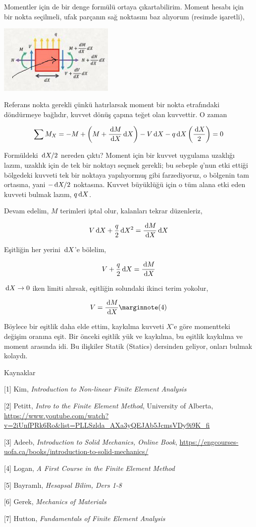 \documentclass[12pt,fleqn]{article}\usepackage{../../common}
\begin{document}
Momentler için de bir denge formülü ortaya çıkartabilirim. Moment hesabı için
bir nokta seçilmeli, ufak parçanın sağ noktasını baz alıyorum (resimde
işaretli),

\includegraphics[width=15em]{phy_020_strs_02_11.jpg}

Referans nokta gerekli çünkü hatırlarsak moment bir nokta etrafındaki
döndürmeye bağlıdır, kuvvet dönüş çapına teğet olan kuvvettir. O zaman 

$$
\sum M_{X} = -M + \left( M + \frac{\,\mathrm{d} M}{\,\mathrm{d} X} \,\mathrm{d} X \right) -
V \,\mathrm{d} X - q \,\mathrm{d} X \left( \frac{\,\mathrm{d} X}{2}  \right) = 0
$$

Formüldeki $\,\mathrm{d} X / 2$ nereden çıktı? Moment için bir kuvvet uygulama uzaklığı
lazım, uzaklık için de tek bir noktayı seçmek gerekli; bu sebeple $q$'nun etki
ettiği bölgedeki kuvveti tek bir noktaya yapılıyormuş gibi farzediyoruz, o
bölgenin tam ortasına, yani $- \,\mathrm{d} X / 2$ noktasına.  Kuvvet büyüklüğü için o
tüm alana etki eden kuvveti bulmak lazım, $q \,\mathrm{d} X$.

Devam edelim, $M$ terimleri iptal olur, kalanları tekrar düzenleriz,

$$
V \,\mathrm{d} X + \frac{q}{2} \,\mathrm{d} X^2 = \frac{\,\mathrm{d} M}{\,\mathrm{d} X} \,\mathrm{d} X
$$

Eşitliğin her yerini $\,\mathrm{d} X$'e bölelim,

$$
V + \frac{q}{2} \,\mathrm{d} X = \frac{\,\mathrm{d} M}{\,\mathrm{d} X} 
$$

$\,\mathrm{d} X \to 0$ iken limiti alırsak, eşitliğin solundaki ikinci terim yokolur,

$$
V = \frac{\ud M}{\ud X}
\mlabel{4}
$$

Böylece bir eşitlik daha elde ettim, kaykılma kuvveti $X$'e göre momentteki
değişim oranına eşit. Bir önceki eşitlik yük ve kaykılma, bu eşitlik kaykılma ve
moment arasında idi. Bu ilişkiler Statik (Statics) dersinden geliyor, onları
bulmak kolaydı.

Kaynaklar

[1] Kim, {\em Introduction to Non-linear Finite Element Analysis}

[2] Petitt, {\em Intro to the Finite Element Method}, University of Alberta,
    \url{https://www.youtube.com/watch?v=2iUnfPRk6Ro&list=PLLSzlda_AXa3yQEJAb5JcmsVDy9i9K_fi}
    
[3] Adeeb, {\em Introduction to Solid Mechanics, Online Book},
    \url{https://engcourses-uofa.ca/books/introduction-to-solid-mechanics/}

[4] Logan, {\em A First Course in the Finite Element Method}

[5] Bayramlı, {\em Hesapsal Bilim, Ders 1-8}

[6] Gerek, {\em Mechanics of Materials}

[7] Hutton, {\em Fundamentals of Finite Element Analysis}
\end{document}
